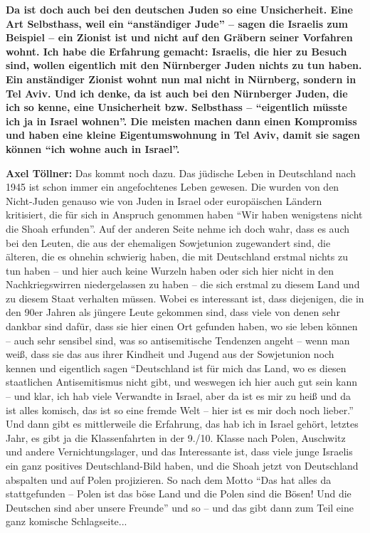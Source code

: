 \textbf{Da ist doch auch bei den deutschen Juden so eine Unsicherheit. Eine Art Selbsthass, weil ein "`anständiger Jude"' – sagen die Israelis zum Beispiel – ein Zionist ist und nicht auf den Gräbern seiner Vorfahren wohnt. Ich habe die Erfahrung gemacht: Israelis, die hier zu Besuch sind, wollen eigentlich mit den Nürnberger Juden nichts zu tun haben. Ein anständiger Zionist wohnt nun mal nicht in Nürnberg, sondern in Tel Aviv. Und ich denke, da ist auch bei den Nürnberger Juden, die ich so kenne, eine Unsicherheit bzw. Selbsthass – "`eigentlich müsste ich ja in Israel wohnen"'. Die meisten machen dann einen Kompromiss und haben eine kleine Eigentumswohnung in Tel Aviv, damit sie sagen können "`ich wohne auch in Israel"'.}  

\textbf{Axel Töllner:} Das kommt noch dazu. Das jüdische Leben in Deutschland nach 1945 ist schon immer ein angefochtenes Leben gewesen. Die wurden von den Nicht-Juden genauso wie von Juden in Israel oder europäischen Ländern kritisiert, die für sich in Anspruch genommen haben "`Wir haben wenigstens nicht die Shoah erfunden"'. Auf der anderen Seite nehme ich doch wahr, dass es auch bei den Leuten, die aus der ehemaligen Sowjetunion zugewandert sind, die älteren, die es ohnehin schwierig haben, die mit Deutschland erstmal nichts zu tun haben – und hier auch keine Wurzeln haben oder sich hier nicht in den Nachkriegswirren niedergelassen zu haben – die sich erstmal zu diesem Land und zu diesem Staat verhalten müssen. Wobei es interessant ist, dass diejenigen, die in den 90er Jahren als jüngere Leute gekommen sind, dass viele von denen sehr dankbar sind dafür, dass sie hier einen Ort gefunden haben, wo sie leben können – auch sehr sensibel sind, was so antisemitische Tendenzen angeht – wenn man weiß, dass sie das aus ihrer Kindheit und Jugend aus der Sowjetunion noch kennen und eigentlich sagen "`Deutschland ist für mich das Land, wo es diesen staatlichen Antisemitismus nicht gibt, und weswegen ich hier auch gut sein kann – und klar, ich hab viele Verwandte in Israel, aber da ist es mir zu heiß und da ist alles komisch, das ist so eine fremde Welt – hier ist es mir doch noch lieber."' \\ Und dann gibt es mittlerweile die Erfahrung, das hab ich in Israel gehört, letztes Jahr, es gibt ja die Klassenfahrten in der 9./10. Klasse nach Polen, Auschwitz und andere Vernichtungslager, und das Interessante ist, dass viele junge Israelis ein ganz positives Deutschland-Bild haben, und die Shoah jetzt von Deutschland abspalten und auf Polen projizieren. So nach dem Motto "`Das hat alles da stattgefunden – Polen ist das böse Land und die Polen sind die Bösen! Und die Deutschen sind aber unsere Freunde"' und so – und das gibt dann zum Teil eine ganz komische Schlagseite... 

